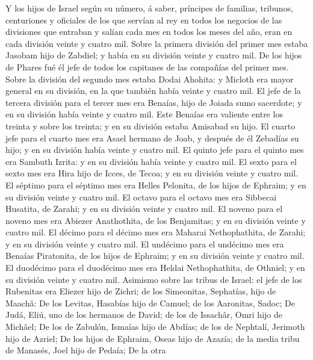  Y los hijos de Israel según su número, á saber, príncipes
de familias, tribunos, centuriones y oficiales de los que servían al rey
en todos los negocios de las divisiones que entraban y salían cada mes
en todos los meses del año, eran en cada división veinte y cuatro mil.
 Sobre la primera división del primer mes estaba Jasobam
hijo de Zabdiel; y había en su división veinte y cuatro mil.
 De los hijos de Phares fué él jefe de todos los capitanes
de las compañías del primer mes.  Sobre la división del
segundo mes estaba Dodai Ahohita: y Micloth era mayor general en su
división, en la que también había veinte y cuatro mil.  El
jefe de la tercera división para el tercer mes era Benaías, hijo de
Joiada sumo sacerdote; y en su división había veinte y cuatro mil.
 Este Benaías era valiente entre los treinta y sobre los
treinta; y en su división estaba Amisabad su hijo.  El
cuarto jefe para el cuarto mes era Asael hermano de Joab, y después de
él Zebadías su hijo; y en su división había veinte y cuatro mil.
 El quinto jefe para el quinto mes era Sambuth Izrita: y en
su división había veinte y cuatro mil.  El sexto para el
sexto mes era Hira hijo de Icces, de Tecoa; y en su división veinte y
cuatro mil.  El séptimo para el séptimo mes era Helles
Pelonita, de los hijos de Ephraim; y en su división veinte y cuatro mil.
 El octavo para el octavo mes era Sibbecai Husatita, de
Zarahi; y en su división veinte y cuatro mil.  El noveno
para el noveno mes era Abiezer Anathothita, de los Benjamitas; y en su
división veinte y cuatro mil.  El décimo para el décimo mes
era Maharai Nethophathita, de Zarahi; y en su división veinte y cuatro
mil.  El undécimo para el undécimo mes era Benaías
Piratonita, de los hijos de Ephraim; y en su división veinte y cuatro
mil.  El duodécimo para el duodécimo mes era Heldai
Nethophathita, de Othniel; y en su división veinte y cuatro mil.
 Asimismo sobre las tribus de Israel: el jefe de los
Rubenitas era Eliezer hijo de Zichri; de los Simeonitas, Sephatías, hijo
de Maachâ:  De los Levitas, Hasabías hijo de Camuel; de los
Aaronitas, Sadoc;  De Judá, Eliú, uno de los hermanos de
David; de los de Issachâr, Omri hijo de Michâel;  De los de
Zabulón, Ismaías hijo de Abdías; de los de Nephtalí, Jerimoth hijo de
Azriel;  De los hijos de Ephraim, Oseas hijo de Azazía; de
la media tribu de Manasés, Joel hijo de Pedaía;  De la otra
